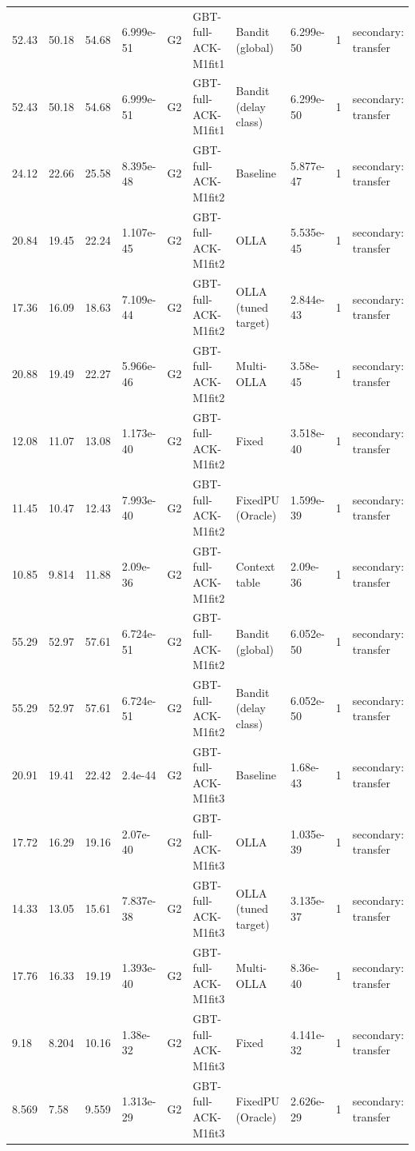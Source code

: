 \documentclass[10pt]{article}
\begin{document}
\begin{landscape}
\begin{longtable}{@{}llllllllll@{}}
52.43 & 50.18 & 54.68 & 6.999e-51 & G2 & GBT-full-ACK-M1fit1 & Bandit (global) & 6.299e-50 & 1 & secondary: transfer \\
52.43 & 50.18 & 54.68 & 6.999e-51 & G2 & GBT-full-ACK-M1fit1 & Bandit (delay class) & 6.299e-50 & 1 & secondary: transfer \\
24.12 & 22.66 & 25.58 & 8.395e-48 & G2 & GBT-full-ACK-M1fit2 & Baseline & 5.877e-47 & 1 & secondary: transfer \\
20.84 & 19.45 & 22.24 & 1.107e-45 & G2 & GBT-full-ACK-M1fit2 & OLLA & 5.535e-45 & 1 & secondary: transfer \\
17.36 & 16.09 & 18.63 & 7.109e-44 & G2 & GBT-full-ACK-M1fit2 & OLLA (tuned target) & 2.844e-43 & 1 & secondary: transfer \\
20.88 & 19.49 & 22.27 & 5.966e-46 & G2 & GBT-full-ACK-M1fit2 & Multi-OLLA & 3.58e-45 & 1 & secondary: transfer \\
12.08 & 11.07 & 13.08 & 1.173e-40 & G2 & GBT-full-ACK-M1fit2 & Fixed & 3.518e-40 & 1 & secondary: transfer \\
11.45 & 10.47 & 12.43 & 7.993e-40 & G2 & GBT-full-ACK-M1fit2 & FixedPU (Oracle) & 1.599e-39 & 1 & secondary: transfer \\
10.85 & 9.814 & 11.88 & 2.09e-36 & G2 & GBT-full-ACK-M1fit2 & Context table & 2.09e-36 & 1 & secondary: transfer \\
55.29 & 52.97 & 57.61 & 6.724e-51 & G2 & GBT-full-ACK-M1fit2 & Bandit (global) & 6.052e-50 & 1 & secondary: transfer \\
55.29 & 52.97 & 57.61 & 6.724e-51 & G2 & GBT-full-ACK-M1fit2 & Bandit (delay class) & 6.052e-50 & 1 & secondary: transfer \\
20.91 & 19.41 & 22.42 & 2.4e-44 & G2 & GBT-full-ACK-M1fit3 & Baseline & 1.68e-43 & 1 & secondary: transfer \\
17.72 & 16.29 & 19.16 & 2.07e-40 & G2 & GBT-full-ACK-M1fit3 & OLLA & 1.035e-39 & 1 & secondary: transfer \\
14.33 & 13.05 & 15.61 & 7.837e-38 & G2 & GBT-full-ACK-M1fit3 & OLLA (tuned target) & 3.135e-37 & 1 & secondary: transfer \\
17.76 & 16.33 & 19.19 & 1.393e-40 & G2 & GBT-full-ACK-M1fit3 & Multi-OLLA & 8.36e-40 & 1 & secondary: transfer \\
9.18 & 8.204 & 10.16 & 1.38e-32 & G2 & GBT-full-ACK-M1fit3 & Fixed & 4.141e-32 & 1 & secondary: transfer \\
8.569 & 7.58 & 9.559 & 1.313e-29 & G2 & GBT-full-ACK-M1fit3 & FixedPU (Oracle) & 2.626e-29 & 1 & secondary: transfer \\

\end{longtable}
\end{landscape}
\end{document}
